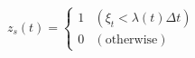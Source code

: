 \documentclass[uplatex,dvipdfmx]{jsarticle}
\begin{document}
\begin{eqnarray*}
  z_s(t) = \left\{
    \begin{array}{ll}
      1 & (\xi_t < \lambda(t) \Delta t) \\
      0 & (\textrm{otherwise})
    \end{array}
    \right.
\end{eqnarray*}
\end{document}
